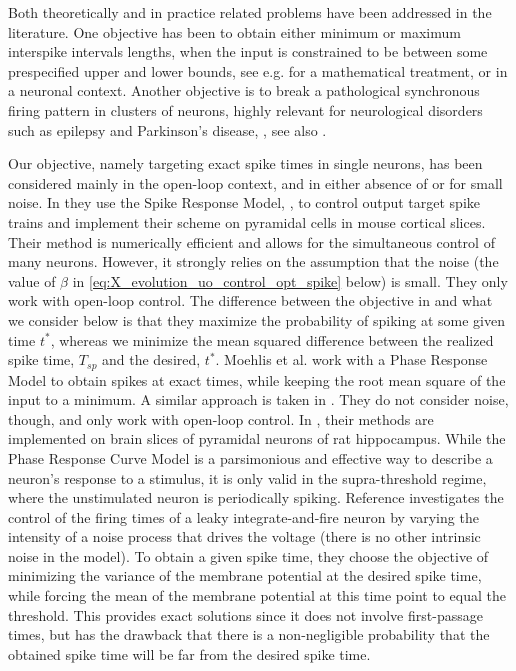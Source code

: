 Both theoretically and in practice related problems have been
addressed in the literature. One objective has been to
obtain either minimum or maximum interspike intervals lengths,
when the input is constrained to be between some prespecified upper
and lower bounds, see e.g. \cite{Lee1994,Lefebvre1987} for a
mathematical treatment, or \cite{Danzl2009,Nabi2012,Wu2009} in a neuronal
context. Another objective is to break a pathological synchronous
firing pattern in clusters of neurons, highly relevant for neurological
disorders such as epilepsy and Parkinson's disease,
\cite{Nabi2013a,Nabi2011}, see also \cite{Feng2007b}.

Our objective, namely targeting exact spike times in single neurons, has been
considered mainly in the open-loop context, and in either absence of or for
small noise. In \cite{Ahmadian2011} they use the Spike Response Model,
\cite{Gerstner2002}, to control output target spike trains and implement their
scheme on pyramidal cells in mouse cortical slices. Their method is numerically
efficient and allows for the simultaneous control of many neurons. However, it strongly relies on the assumption
that the noise (the value of $\beta$ in \cref{eq:X_evolution_uo_control_opt_spike} below) is small.
They only work with open-loop control.
The difference between the objective in \cite{Ahmadian2011} and what we consider
below is that they maximize the probability of spiking at some given time $t^*$, whereas we minimize the mean squared
difference between the realized spike time, $T_{sp}$ and the desired, $t^*$.
Moehlis et al. \cite{Moehlis2006} work with a Phase Response Model to obtain
spikes at exact times, while keeping the root mean square of the input to a
minimum. A similar approach is taken in \cite{Dasanayake2011}. They do not
consider noise, though, and only work with open-loop control. In
\cite{Nabi2013}, their methods are implemented on brain slices of pyramidal
neurons of rat hippocampus. While the
Phase Response Curve Model is a parsimonious and effective way to describe a
neuron's response to a stimulus, it is only valid in the supra-threshold regime,
where the unstimulated neuron is periodically spiking. Reference
\cite{Feng2003} investigates the control of the firing times of a
leaky integrate-and-fire neuron by varying the intensity of a noise process that
drives the voltage (there is no other intrinsic noise in the model). 
To obtain a given spike time, they choose the objective of minimizing the
variance of the membrane potential at the desired spike time, while forcing the
mean of the membrane potential at this time point to equal the threshold. This
provides exact solutions since it does not involve first-passage times, but has
the drawback that there is a non-negligible probability that the obtained spike
time will be far from the desired spike time.

